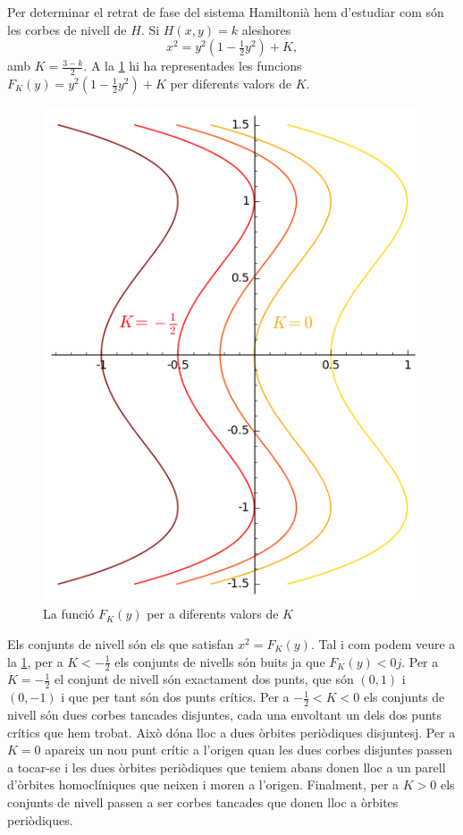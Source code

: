 \documentclass[12pt]{report}
\numberwithin{table}{section}
\numberwithin{equation}{section}
\numberwithin{figure}{section}
\begin{document}
\begin{enumerate}[label=(\roman*), font=\bfseries \sffamily, wide, labelwidth=!, labelindent=0pt]
		Per determinar el retrat de fase del sistema Hamiltonià hem d'estudiar com són les corbes de nivell de \( H \). Si \( H(x, y) = k \) aleshores
		\begin{equation*}
			x^2 = y^2\left(1 - \tfrac{1}{2}y^2\right) + K,
		\end{equation*}
		amb \( K = \frac{3-k}{2} \). A la \cref{fig:valors del hamiltonia} hi ha representades les funcions \( F_K(y) = y^2\left(1 - \tfrac{1}{2}y^2\right) + K \) per diferents valors de \( K \).
		
		\begin{figure}[htb]
			\centering \sffamily \small
			\includegraphics[scale = 0.7]{hamiltonia}
			\caption{La funció \( F_K(y) \) per a diferents valors de \( K \)}
			\label{fig:valors del hamiltonia}
		\end{figure}
		
		Els conjunts de nivell són els que satisfan \( x^2 = F_K(y) \).  Tal i com podem veure a la \cref{fig:valors del hamiltonia}, per a \( K < - \tfrac{1}{2} \) els conjunts de nivells són buits ja que \( F_K(y) < 0j \). Per a \( K = - \frac{1}{2} \)	el conjunt de nivell són exactament dos punts, que són \( (0,1) \) i \( (0,-1) \) i que per tant són dos punts crítics. Per a \( - \frac{1}{2} < K < 0 \) els conjunts de nivell són dues corbes tancades disjuntes, cada una envoltant un dels dos punts crítics que hem trobat. Això dóna lloc a dues òrbites periòdiques disjuntesj. Per a \( K = 0 \) apareix un nou punt crític a l'origen quan les dues corbes disjuntes passen a tocar-se i les dues òrbites periòdiques que teniem abans donen lloc a un parell d'òrbites homoclíniques que neixen i moren a l'origen. Finalment, per a \( K > 0 \) els conjunts de nivell passen a ser corbes tancades que donen lloc a òrbites periòdiques.  


\end{enumerate}
\end{document}
